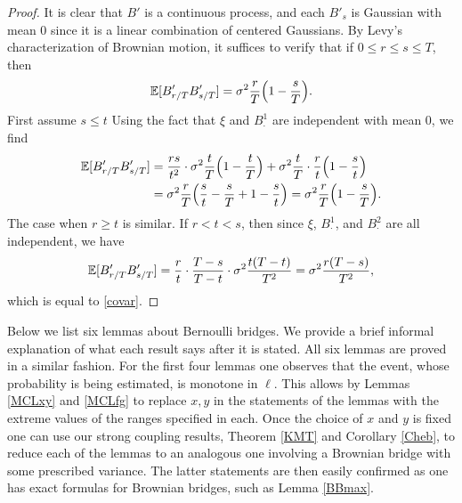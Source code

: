 \begin{proof}
	It is clear that $B'$ is a continuous process, and each $B'_s$ is Gaussian with mean 0 since it is a linear combination of centered Gaussians. By Levy's characterization of Brownian motion, it suffices to verify that if $0\leq r\leq s\leq T$, then
	\begin{equation}\label{covar}
	\mathbb{E}[B'_{r/T}B'_{s/T}] = \sigma^2 \frac{r}{T}\Big(1-\frac{s}{T}\Big).
	\end{equation}
	First assume $s\leq t$ Using the fact that $\xi$ and $B^1_\cdot$ are independent with mean 0, we find
	\begin{align*}
	\mathbb{E}[B'_{r/T}B'_{s/T}] &= \frac{rs}{t^2}\cdot\sigma^2\frac{t}{T}\Big(1-\frac{t}{T}\Big) + \sigma^2\frac{t}{T}\cdot\frac{r}{t}\Big(1-\frac{s}{t}\Big)\\
	&= \sigma^2\frac{r}{T}\Big(\frac{s}{t} - \frac{s}{T} + 1 - \frac{s}{t}\Big) = \sigma^2\frac{r}{T}\Big(1-\frac{s}{T}\Big).
	\end{align*}
	The case when $r\geq t$ is similar. If $r < t < s$, then since $\xi$, $B^1_\cdot$, and $B^2_\cdot$ are all independent, we have
	\[
	\mathbb{E}[B_{r/T}'B_{s/T}'] = \frac{r}{t}\cdot\frac{T-s}{T-t}\cdot\sigma^2\frac{t(T-t)}{T^2} = \sigma^2\frac{r(T-s)}{T^2},
	\]
	which is equal to \eqref{covar}.
\end{proof}

Below we list six lemmas about Bernoulli bridges. We provide a brief informal explanation of what each result says after it is stated. All six lemmas are proved in a similar fashion. For the first four lemmas one observes that the event, whose probability is being estimated, is monotone in $\ell$. This allows by Lemmas \ref{MCLxy} and \ref{MCLfg} to replace $x,y$ in the statements of the lemmas with the extreme values of the ranges specified in each. Once the choice of $x$ and $y$ is fixed one can use our strong coupling results, Theorem \ref{KMT} and Corollary \ref{Cheb}, to reduce each of the lemmas to an analogous one involving a Brownian bridge with some prescribed variance. The latter statements are then easily confirmed as one has exact formulas for Brownian bridges, such as Lemma \ref{BBmax}.\\

